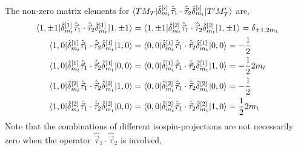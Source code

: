 \documentclass[10pt]{article}
\begin{document}
The non-zero matrix elements for $ \braket{ T M_T |  \hat{\delta}_{m_t}^{[i]} \hat{\vec{\tau}}_{1} \cdot \hat{\vec{\tau}}_{2} \hat{\delta}_{m_t}^{[i]} | T' M_T'}$ are,
\begin{align*}
	\braket{ 1, \pm 1 | \hat{\delta}_{m_t}^{[1]} \hat{\vec{\tau}}_{1} \cdot \hat{\vec{\tau}}_{2} \hat{\delta}_{m_t}^{[1]} | 1, \pm 1} &= \braket{ 1, \pm 1 | \hat{\delta}_{m_t}^{[2]} \hat{\vec{\tau}}_{1} \cdot \hat{\vec{\tau}}_{2} \hat{\delta}_{m_t}^{[2]} | 1, \pm 1} = \delta_{ \pm 1,2m_t}  \\
	\braket{ 1,0 | \hat{\delta}_{m_t}^{[1]} \hat{\vec{\tau}}_{1} \cdot \hat{\vec{\tau}}_{2} \hat{\delta}_{m_t}^{[1]} | 1,0} &= \braket{ 0,0 | \hat{\delta}_{m_t}^{[1]} \hat{\vec{\tau}}_{1} \cdot \hat{\vec{\tau}}_{2} \hat{\delta}_{m_t}^{[1]}| 0,0} = -\frac{1}{2} \\
	\braket{ 1,0 | \hat{\delta}_{m_t}^{[1]} \hat{\vec{\tau}}_{1} \cdot \hat{\vec{\tau}}_{2} \hat{\delta}_{m_t}^{[1]} | 0,0} &= \braket{ 0,0 | \hat{\delta}_{m_t}^{[1]} \hat{\vec{\tau}}_{1} \cdot \hat{\vec{\tau}}_{2} \hat{\delta}_{m_t}^{[1]}| 1,0}=-\frac{1}{2} 2m_t \\
		\braket{ 1,0 | \hat{\delta}_{m_t}^{[2]} \hat{\vec{\tau}}_{1} \cdot \hat{\vec{\tau}}_{2} \hat{\delta}_{m_t}^{[2]} | 1,0} &= \braket{ 0,0 | \hat{\delta}_{m_t}^{[2]} \hat{\vec{\tau}}_{1} \cdot \hat{\vec{\tau}}_{2} \hat{\delta}_{m_t}^{[2]}| 0,0} = -\frac{1}{2} \\
	\braket{ 1,0 | \hat{\delta}_{m_t}^{[2]} \hat{\vec{\tau}}_{1} \cdot \hat{\vec{\tau}}_{2} \hat{\delta}_{m_t}^{[2]} | 0,0} &= \braket{ 0,0 | \hat{\delta}_{m_t}^{[2]} \hat{\vec{\tau}}_{1} \cdot \hat{\vec{\tau}}_{2} \hat{\delta}_{m_t}^{[2]}| 1,0}=\frac{1}{2} 2m_t
\end{align*}
Note that the combinations of different isospin-projections are not necessarily zero when the operator $ \hat{\vec{\tau}}_{1} \cdot \hat{\vec{\tau}}_{2}$ is involved,
\end{document}
